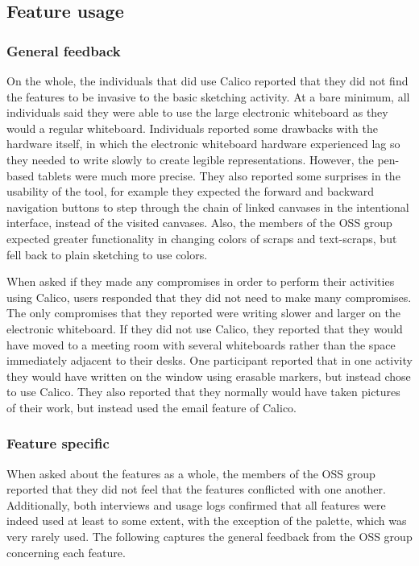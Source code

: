 \documentclass[12pt,fleqn]{ucithesis}
\begin{document}
\subsection{Feature usage}
\label{chapter:evaluation:deployment1:part1}

\subsubsection{General feedback}

On the whole, the individuals that did use Calico reported that they did not find the features to be invasive to the basic sketching activity. At a bare minimum, all individuals said they were able to use the large electronic whiteboard as they would a regular whiteboard. Individuals reported some drawbacks with the hardware itself, in which the electronic whiteboard hardware experienced lag so they needed to write slowly to create legible representations. However, the pen-based tablets were much more precise. They also reported some surprises in the usability of the tool, for example they expected the forward and backward navigation buttons to step through the chain of linked canvases in the intentional interface, instead of the visited canvases. Also, the members of the OSS group expected greater functionality in changing colors of scraps and text-scraps, but fell back to plain sketching to use colors.

When asked if they made any compromises in order to perform their activities using Calico, users responded that they did not need to make many compromises. The only compromises that they reported were writing slower and larger on the electronic whiteboard. If they did not use Calico, they reported that they would have moved to a meeting room with several whiteboards rather than the space immediately adjacent to their desks. One participant reported that in one activity they would have written on the window using erasable markers, but instead chose to use Calico. They also reported that they normally would have taken pictures of their work, but instead used the email feature of Calico.

\subsubsection{Feature specific}

When asked about the features as a whole, the members of the OSS group reported that they did not feel that the features conflicted with one another. Additionally, both interviews and usage logs confirmed that all features were indeed used at least to some extent, with the exception of the palette, which was very rarely used. The following captures the general feedback from the OSS group concerning each feature.
\end{document}
